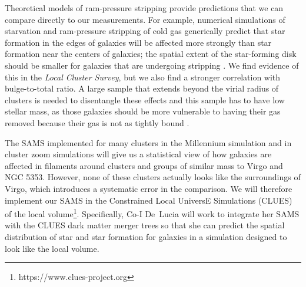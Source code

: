\documentclass[11pt, preprint]{aastex}
\begin{document}
{%



Theoretical models of ram-pressure stripping provide predictions that
we can compare directly to our measurements.
For example, numerical simulations of starvation and ram-pressure stripping of cold gas 
generically predict that star formation in the edges
of galaxies will be affected more strongly than star formation near the
centers of galaxies; the spatial extent of the star-forming disk
should be smaller for galaxies that are undergoing stripping \citep[e.g.][]{kawata08, bekki14}.
We find evidence of this in the {\it Local Cluster Survey}, but we
also find a stronger correlation with bulge-to-total ratio.  A large sample that extends beyond the virial radius of clusters is needed to disentangle these effects and this sample has to have low stellar mass, as those galaxies should be more
vulnerable to having their gas removed 
because their gas is not as tightly
bound \citep[e.g.][]{kawata08, mccarthy07, bekki14}.


The SAMS implemented for many clusters in the Millennium simulation and in cluster zoom simulations will give us a statistical view of how galaxies are affected in filaments around clusters and groups of similar mass to Virgo and NGC 5353.  However, none of these clusters actually looks like the surroundings of Virgo, which introduces a systematic error in the comparison.  We will therefore implement our SAMS in the Constrained Local UniversE Simulations (CLUES) of the local volume\footnote{https://www.clues-project.org}.   Specifically, Co-I De~Lucia will work to integrate her SAMS with the
CLUES  dark matter merger trees so that she can predict the spatial
distribution of star and star formation for galaxies in a simulation designed to look like the local volume.

}
\end{document}
